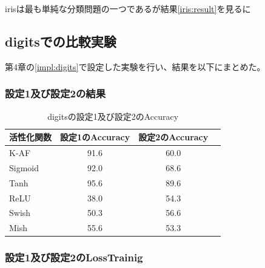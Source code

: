 irisは最も単純な分類問題の一つであるが結果\ref{iris:result}を見るに






\subsection{digitsでの比較実験}
\label{ev:digitsでの比較実験}
第4章の\ref{impl:digits}で設定した実験を行い、結果を以下にまとめた。
\subsubsection{設定1及び設定2の結果}
\label{digits:result}

\begin{table}[htbp]
    \begin{center}
        \caption{digitsの設定1及び設定2のAccuracy}
        \vspace{2mm} 
        \begin{tabular}{l*{2}{c}r}
            活性化関数              & 設定1のAccuracy &  設定2のAccuracy \\
            \hline
            K-AF            & 91.6 & 60.0 \\
            Sigmoid            & 92.0 & 68.6\\
            Tanh            & 95.6 & 89.6 \\
            ReLU        & 38.0 & 54.3 \\
            Swish           & 50.3 & 56.6 \\
            Mish           & 55.6 & 53.3 \\
    
        \end{tabular}
    \end{center}
\end{table}


\subsubsection{設定1及び設定2のLossTrainig}
\label{digits:loss}



